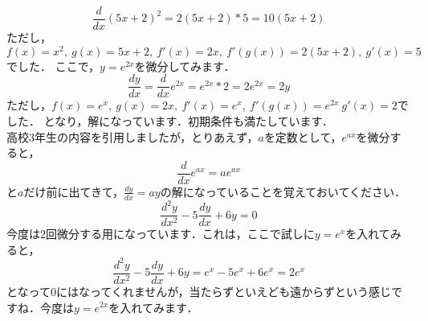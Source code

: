 \[
\frac{d}{dx}(5x+2)^2 = 2(5x+2) *5 = 10(5x+2)
\]
ただし，$f(x) = x^2 ,\ g(x) = 5x+2 ,\ f'(x) = 2x ,\ f'(g(x)) = 2(5x+2) , \ g'(x) = 5$でした．
ここで，$y=e^{2x}$を微分してみます．
\[
\frac{dy}{dx}  = \frac{d}{dx}e^{2x} = e^{2x} * 2 = 2 e^{2x} = 2y
\]
ただし，$f(x) = e^x ,\  g(x) =2x ,\  f'(x) = e^x ,\ f'(g(x)) = e^{2x}\ g'(x) =2 $でした．
となり，解になっています．初期条件も満たしています．\\
高校$3$年生の内容を引用しましたが，とりあえず，$a$を定数として，$e^{ax}$を微分すると，
\[
\frac{d}{dx}e^{ax} = ae^{ax}
\]
と$a$だけ前に出てきて，$\frac{dy}{dx} = ay$の解になっていることを覚えておいてください．
\exx
\ex
\[
\frac{d^2 y}{dx^2} - 5 \frac{dy}{dx} + 6y = 0
\]
今度は$2$回微分する用になっています．これは，ここで試しに$y=e^{x}$を入れてみると，
\[
\frac{d^2 y}{dx^2} - 5 \frac{dy}{dx} + 6y =  e^x - 5e^x + 6 e^x = 2e^x
\]
となって$0$にはなってくれませんが，当たらずといえども遠からずという感じですね．今度は$y=e^{2x}$を入れてみます．

